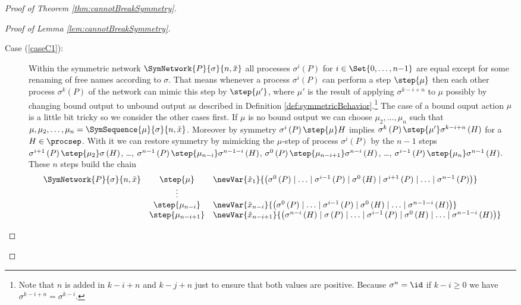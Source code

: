 \documentclass[11pt,techReport]{eptcs}
\begin{document}
\begin{proof}[Proof of Theorem \ref{thm:cannotBreakSymmetry}]
\begin{proof}[Proof of Lemma \ref{lem:cannotBreakSymmetry}]
\begin{description}
		\item[Case (\ref{caseC1}):] Within the symmetric network $ \SymNetwork{P}{\sigma}{n, \tilde{x}} $ all processes $ \sigma^i\left( P \right) $ for $ i \in \Set{ 0, \ldots, n{-}1 } $ are equal except for some renaming of free names according to $ \sigma $. That means whenever a process $ \sigma^i\left( P \right) $ can perform a step $ \step{\mu} $ then each other process $ \sigma^k\left( P \right) $ of the network can mimic this step by $ \step{\mu'} $, where $ \mu' $ is the result of applying $ \sigma^{k{-}i{+}n} $ to $ \mu $ possibly by changing bound output to unbound output as described in Definition \ref{def:symmetricBehavior}.\footnote{Note that $ n $ is added in $ k{-}i{+}n $ and $ k{-}j{+}n $ just to ensure that both values are positive. Because $ \sigma^n = \id $ if $ k{-}i \geq 0 $ we have $ \sigma^{k{-}i{+}n} = \sigma^{k{-}i} $.} The case of a bound ouput action $ \mu $ is a little bit tricky so we consider the other cases first. If $ \mu $ is no bound output we can choose $ \mu_2, \ldots, \mu_n $ such that $ \mu, \mu_2, \ldots, \mu_n = \SymSequence{\mu}{\sigma}{n, \tilde{x}} $. Moreover by symmetry $ \sigma^i\left( P \right) \step{\mu} H $ implies $ \sigma^k\left( P \right) \step{\mu'} \sigma^{k -i{+}n}\left( H \right) $ for a $ H \in \procsep $. With it we can restore symmetry by mimicking the $ \mu $-step of process $ \sigma^i\left( P \right) $ by the $ n {-} 1 $ steps $ \sigma^{i{+}1}\left( P \right) \step{\mu_2} \sigma\left( H \right) $, \ldots, $ \sigma^{n{-}1}\left( P \right) \step{\mu_{n{-}i}} \sigma^{n{-}1{-}i}\left( H \right) $, $ \sigma^0\left( P \right) \step{\mu_{n{-}i{+}1}} \sigma^{n{-}i}\left( H \right) $, \ldots, $ \sigma^{i{-}1}\left( P \right) \step{\mu_n} \sigma^{n{-}1}\left( H \right) $. These $ n $ steps build the chain
			\begin{align*}
				\begin{array}{lcl}
					\SymNetwork{P}{\sigma}{n, \tilde{x}} & \step{\mu} & \newVar{\tilde{x}_1}{\left( \sigma^0\left( P \right) \mid \ldots \mid \sigma^{i{-}1}\left( P \right) \mid \sigma^0\left( H \right) \mid \sigma^{i{+}1}\left( P \right) \mid \ldots \mid \sigma^{n{-}1}\left( P \right) \right)}\\
					& \vdots\\
					& \step{\mu_{n{-}i}} & \newVar{\tilde{x}_{n{-}i}}{\left( \sigma^0\left( P \right) \mid \ldots \mid \sigma^{i{-}1}\left( P \right) \mid \sigma^0\left( H \right) \mid \ldots \mid \sigma^{n{-}1{-}i}\left( H \right) \right)}\\
					& \step{\mu_{n{-}i{+}1}} & \newVar{\tilde{x}_{n{-}i{+}1}}{\left( \sigma^{n{-}i}\left( H \right) \mid \sigma\left( P \right) \mid \ldots \mid \sigma^{i{-}1}\left( P \right) \mid \sigma^0\left( H \right) \mid \ldots \mid \sigma^{n{-}1{-}i}\left( H \right) \right)}\\

\end{array}
\end{align*}
\end{description}
\end{proof}
\end{proof}
\end{document}
